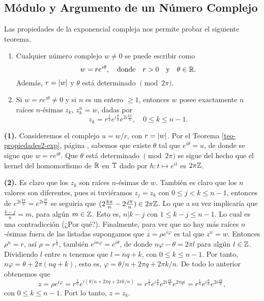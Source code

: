 \subsection{Módulo y Argumento de un Número Complejo}
Las propiedades de la exponencial compleja nos permite probar el siguiente teorema.
\begin{theo}
    \begin{enumerate}
        \item Cualquier número complejo \(w\neq 0\) se puede escribir como 
        \[
            w=re^{i\theta}, \quad \text{donde}\quad r>0 \quad \text{y}\quad \theta\in \mathbb{R}.
        \]
        Además, \(r=\left\lvert w\right\rvert\) y \(\theta\) está determinado \(\pmod{2\pi}\).
        \item Si  \(w=re^{i\theta} \neq 0\) y si \(n\) es un entero \(\geq 1\), entonces \(w\) posee exactamente \(n\) raíces \(n\)-ésimas \(z_k\), \(z_k^n = w\),
        dadas por 
        \[
            z_k = r^{\frac{1}{n}}e^{i\frac{\theta}{n}}e^{2i\frac{k\pi}{n}}, \quad 0\leq k\leq n-1.
        \]
    \end{enumerate}
\end{theo}
\begin{dem}
    {\bf (1).} Consideremos el complejo \(u = w/r\), con \(r = \left\lvert w\right\rvert\). Por el Teorema \ref{teo-propiedades2-exp}, 
    página \pageref{teo-propiedades2-exp}, sabemos que existe \(\theta\) tal que \(e^{i\theta} = u\), de donde se sigue
    que \(w = re^{i\theta}\). Que \(\theta\) está determinado \(\pmod{2\pi}\) se sigue del hecho que el kernel del homomorfismo
    de \(\mathbb{R}\) en \(\mathbb{T}\) dado por \(h: t \mapsto e^{it}\) es \(2\pi\mathbb{Z}\).

    {\bf (2).} Es claro que los \(z_k\) son raíces \(n\)-ésimas de \(w\). También es claro que los \(n\) valores son diferentes, pues si tuviéramos
    \(z_j = z_k\) con \(0\leq j < k \leq n-1\), entonces de \(e^{2i\frac{k\pi}{n}} = e^{2i\frac{j\pi}{n}}\) se seguiría que \((2\frac{k\pi}{n} - 2\frac{j\pi}{n}) \in 2\pi\mathbb{Z} \).
    Lo que a su vez implicaría que \(\frac{k-j}{n} = m\), para algún \(m \in \mathbb{Z}\). Esto es, \(n | k-j\) con \(1\leq k-j \leq n-1\). Lo cual es una
    contradicción (¿Por qué?). Finalmente, para ver que no hay más raíces \(n\)-ésimas fuera de las listadas supongamos que \(z= \rho e^{i\varphi}\)
    es tal que \(z^n = w\). Entonces \(\rho^n = r\), así \( \rho = r^{\frac{1}{n}}\), también \(e^{in\varphi} = e^{i\theta}\), de donde 
    \(n\varphi - \theta = 2\pi l \) para algún \(l\in \mathbb{Z}\). Dividiendo \(l\) entre \(n\) tenemos que \(l = nq + k\), con \(0\leq k \leq n-1 \). 
    Por tanto, \(n\varphi = \theta + 2\pi (nq + k) \), esto es, \(\varphi = \theta/n + 2\pi q + 2\pi k / n\). De todo lo anterior obtenemos que 
    \[
    z = \rho e^{i\varphi} = r^{\frac{1}{n}}e^{i(\theta/n + 2\pi q + 2\pi k / n)} = 
    r^{\frac{1}{n}}e^{i\frac{\theta}{n}}e^{2i\frac{\pi k}{n}}e^{2\pi qi} = r^{\frac{1}{n}}e^{i\frac{\theta}{n}}e^{2i\frac{\pi k}{n}},
    \] 
    con \(0\leq k \leq n-1\). Port lo tanto, \(z = z_k\).
\end{dem}

